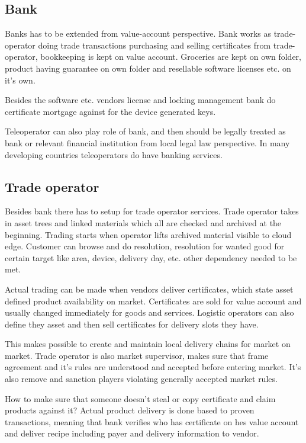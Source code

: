 \subsection{Bank}
\label{bank}
Banks has to be extended from value-account perspective. Bank works as trade-operator doing trade transactions purchasing and selling certificates from trade-operator, bookkeeping is kept on value account. Groceries are kept on own folder, product having guarantee on own folder and resellable software licenses etc. on it's own.

Besides the software etc. vendors license and locking management bank do certificate mortgage against for the device generated keys.

Teleoperator can also play role of bank, and then should be legally treated as bank or relevant financial institution from local legal law perspective. In many developing countries teleoperators do have banking services.

\subsection{Trade operator}
\label{trade_operator}
Besides bank there has to setup for trade operator services. Trade operator takes in asset trees and linked materials which all are checked and archived at the beginning. Trading starts when operator lifts archived material visible to cloud edge. Customer can browse and do resolution, resolution for wanted good for certain target like area, device, delivery day, etc. other dependency needed to be met. 

Actual trading can be made when vendors deliver certificates, which state asset defined product availability on market. Certificates are sold for value account and usually changed immediately for goods and services. Logistic operators can also define they asset and then sell certificates for delivery slots they have.

This makes possible to create and maintain local delivery chains for market on market. Trade operator is also market supervisor, makes sure that frame agreement and it's rules are understood and accepted before entering market. It's also remove and sanction players violating generally accepted market rules.

How to make sure that someone doesn't steal or copy certificate and claim products against it? Actual product delivery is done based to proven transactions, meaning that bank verifies who has certificate on hes value account and deliver recipe including payer and delivery information to vendor.

